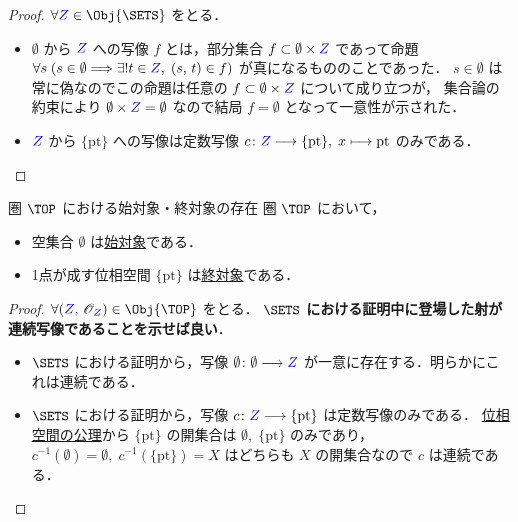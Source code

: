 \documentclass[geometry_main]{subfiles}
\begin{document}
\begin{proof}
	$\forall \textcolor{blue}{Z} \in \Obj{\SETS}$ をとる．
	\begin{itemize}
		\item $\emptyset$ から $\textcolor{blue}{Z}$ への写像 $f$ とは，部分集合 $f \subset \emptyset \times \textcolor{blue}{Z}$ であって命題 $\forall s \; (s \in \emptyset \Longrightarrow \exists ! t \in \textcolor{blue}{Z},\; (s,\, t) \in f )$ が真になるもののことであった．
		$s \in \emptyset$ は常に偽なのでこの命題は任意の $f \subset \emptyset \times \textcolor{blue}{Z}$ について成り立つが，
		集合論の約束により $\emptyset \times \textcolor{blue}{Z} = \emptyset$ なので結局 $f = \emptyset$ となって一意性が示された．
		\item $\textcolor{blue}{Z}$ から $\{\mathrm{pt}\}$ への写像は定数写像 $c \colon \textcolor{blue}{Z} \longrightarrow \{\mathrm{pt}\},\; x \longmapsto \mathrm{pt}$ のみである．
	\end{itemize}
\end{proof}

\begin{myprop}[]{圏 $\TOP$ における始対象・終対象の存在}
	圏 $\TOP$ において，
	\begin{itemize}
		\item 空集合 $\emptyset$ は\hyperref[def:initial-terminal]{始対象}である．
		\item 1点が成す位相空間 $\{\mathrm{pt}\}$ は\hyperref[def:initial-terminal]{終対象}である．
	\end{itemize}
\end{myprop}

\begin{proof}
	$\forall \phase{\textcolor{blue}{Z}} \in \Obj{\TOP}$ をとる．
	$\SETS$ \textbf{における証明中に登場した射が連続写像であることを示せば良い}．
	\begin{itemize}
		\item $\SETS$ における証明から，写像 $\emptyset \colon \emptyset \longrightarrow \textcolor{blue}{Z}$ が一意に存在する．明らかにこれは連続である．
		\item $\SETS$ における証明から，写像 $c \colon \textcolor{blue}{Z} \longrightarrow \{\mathrm{pt}\}$ は定数写像のみである．
		\hyperref[ax.topo]{位相空間の公理}から $\{\mathrm{pt}\}$ の開集合は $\emptyset,\; \{\mathrm{pt}\}$ のみであり，
		$c^{-1}(\emptyset) = \emptyset,\; c^{-1}(\{\mathrm{pt}\}) = X$ はどちらも $X$ の開集合なので $c$ は連続である．
	\end{itemize}
\end{proof}
\end{document}
